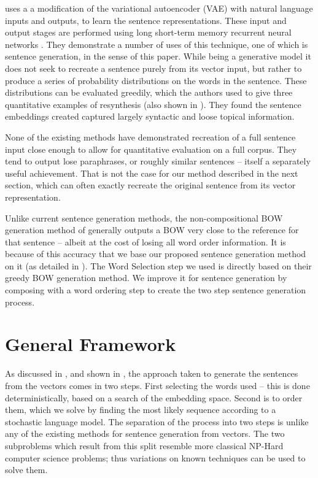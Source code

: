 \documentclass[11pt]{article}
\theoremstyle{plain}
\theoremstyle{definition}
\newcommand{\parencite}{\protect\cite}
\newcommand{\textcite}{\protect\newcite}
\begin{document}

\textcite{Bowman2015SmoothGeneration} uses a a modification of the variational autoencoder (VAE) \parencite{kingma2013auto} with natural language inputs and outputs, to learn the sentence representations. These input and output stages are performed using long short-term memory recurrent neural networks \parencite{hochreiter1997long}. They demonstrate a number of uses of this technique, one of which is sentence generation, in the sense of this paper.
While being a generative model it does not seek to recreate a sentence purely from its vector input, but rather to produce a series of probability distributions on the words in the sentence. These distributions can be evaluated greedily, which the authors used to give three quantitative examples of resynthesis (also shown in ). They found the sentence embeddings created captured largely syntactic and loose topical information. 

None of the existing methods have demonstrated recreation of a full sentence input close enough to allow for quantitative evaluation on a full corpus. They tend to output lose paraphrases, or roughly similar sentences -- itself a separately useful achievement.  That is not the case for our method described in the next section, which can often exactly recreate the original sentence from its vector representation.

Unlike current sentence generation methods, the non-compositional BOW generation method of \textcite{White2015BOWgen} generally outputs a BOW very close to the reference for that sentence -- albeit at the cost of losing all word order information. It is because of this accuracy that we base our proposed sentence generation method on it (as detailed in ). The Word Selection step we used is directly based on their greedy BOW generation method. We improve it for sentence generation by composing with a word ordering step to create the two step sentence generation process.


\section{General Framework}\label{framework}
As discussed in , and shown in , the approach taken to generate the sentences from the vectors comes in two steps. First selecting the words used -- this is done deterministically, based on a search of the embedding space. Second is to order them, which we solve by finding the most likely sequence according to a stochastic language model. The separation of the process into two steps is unlike any of the existing methods for sentence generation from vectors. The two subproblems which result from this split resemble more classical NP-Hard computer science problems; thus variations on known techniques can be used to solve them.
\end{document}
